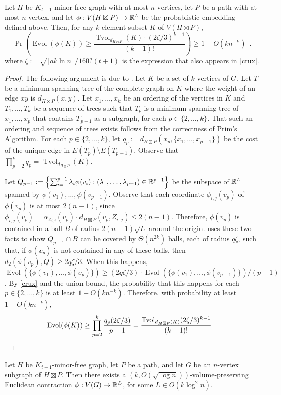 \documentclass{patmorin}
\DeclareMathOperator{\evol}{Evol}
\DeclareMathOperator{\tvol}{Tvol}
\begin{document}
\begin{lem}
  Let $H$ be $K_{t+1}$-minor-free graph with at most $n$ vertices, let $P$ be a path with at most $n$ vertex, and let $\phi:V(H\boxtimes P)\to\mathbb{R}^L$ be the probablistic embedding defined above.  Then, for any $k$-element subset $K$ of $V(H\boxtimes P)$,
  \[
    \Pr\left(\evol(\phi(K)) \ge \frac{\tvol_{d_{H\boxtimes P}}(K)\cdot(2\zeta/3)^{k-1}}{(k-1)!}\right) \ge 1- O(kn^{-k}) \enspace .
  \]
  where $\zeta:=\sqrt{\lceil ak\ln n\rceil}/160?(t+1)$ is the expression that also appears in \cref{crux}.
\end{lem}

\begin{proof}
  The following argument is due to \citet{feige:approximating}.  Let $K$ be a set of $k$ vertices of $G$.  Let $T$ be a minimum spanning tree of the complete graph on $K$ where the weight of an edge $xy$ is $d_{H\boxtimes P}(x,y)$.  Let $x_1,\ldots,x_k$ be an ordering of the vertices in $K$ and $T_1,\ldots,T_k$ be a sequence of trees such that $T_{p}$ is a minimum spanning tree of $x_1,\ldots,x_{p}$ that contains $T_{p-1}$ as a subgraph, for each $p\in\{2,\ldots,k\}$.  That such an ordering and sequence of trees exists follows from the correctness of Prim's Algorithm. For each $p\in\{2,\ldots,k\}$, let $q_p:=d_{H\boxtimes P}(x_p,\{x_1,\ldots,x_{p-1}\})$ be the cost of the unique edge in $E(T_p)\setminus E(T_{p-1})$.  Observe that $\prod_{p=2}^k q_p = \tvol_{d_{H\boxtimes P}}(K)$.

  Let $Q_{p-1}:=\left\{\sum_{i=1}^{p-1}\lambda_i\phi(v_i):(\lambda_1,\ldots,\lambda_{p-1})\in\mathbb{R}^{p-1}\right\}$ be the subspace of $\mathbb{R}^L$ spanned by $\phi(v_1),\ldots,\phi(v_{p-1})$.  Observe that each coordinate $\phi_{i,j}(v_p)$ of $\phi(v_p)$ is at most $2(n-1)$, since $\phi_{i,j}(v_p)=\alpha_{Z_{i,j}}(v_p)\cdot d_{H\boxtimes P}(v_p, Z_{i,j})\le 2(n-1)$. Therefore, $\phi(v_p)$ is contained in a ball $B$ of radius $2(n-1)\sqrt{L}$ around the origin. \citet{feige:approximating} uses these two facts to show $Q_{p-1}\cap B$ can be covered by $\Theta(n^{2k})$ balls, each of radius $q\zeta$, such that, if $\phi(v_p)$ is not contained in any of these balls, then $d_2(\phi(v_p),Q)\ge 2q\zeta/3$.  When this happens, $\evol(\{\phi(v_1),\ldots,\phi(v_p)\})\ge (2q\zeta/3)\cdot\evol(\{\phi(v_1),\ldots,\phi(v_{p-1})\})/(p-1)$.  By \cref{crux} and the union bound, the probability that this happens for each $p\in\{2,\ldots,k\}$ is at least $1-O(kn^{-k})$.  Therefore, with probability at least $1-O(kn^{-k})$,
  \[
    \evol(\phi(K)) \ge \prod_{p=2}^{k}\frac{q_p(2\zeta/3)}{p-1} = \frac{\tvol_{d_{H\boxtimes P}(K)}(2\zeta/3)^{k-1}}{(k-1)!} \enspace . \qedhere
  \]
\end{proof}

\begin{thm}
  Let $H$ be $K_{t+1}$-minor-free graph, let $P$ be a path, and let $G$ be an $n$-vertex subgraph of $H\boxtimes P$.  Then there exists a $(k,O(\sqrt{\log n}))$-volume-preserving Euclidean contraction $\phi:V(G)\to\mathbb{R}^{L}$, for some $L\in O(k\log^2 n)$.
\end{thm}






\end{document}
